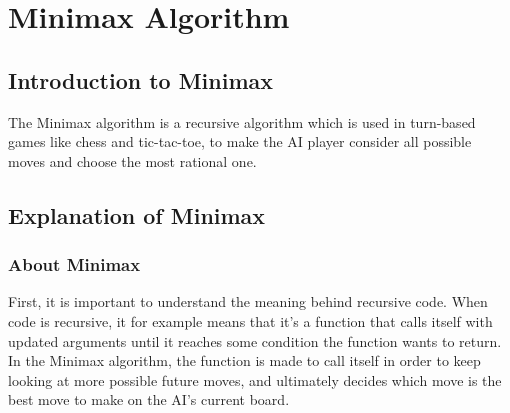 \section{Minimax Algorithm} 
\label{sec:Minimax Algorithm}

\subsection{Introduction to Minimax}
\label{subsec:Introduction to Minimax}
The Minimax algorithm is a recursive algorithm which is used in turn-based games like chess and tic-tac-toe, 
to make the AI player consider all possible moves and choose the most rational one.

\subsection{Explanation of Minimax}
\label{subsec:Explanation of Minimax}
\subsubsection{About Minimax}
First, it is important to understand the meaning behind recursive code. 
When code is recursive, it for example means that it's a function that calls itself with updated arguments until it reaches some condition the function wants to return. 
In the Minimax algorithm, the function is made to call itself in order to keep looking at more possible future moves, 
and ultimately decides which move is the best move to make on the AI’s current board.
